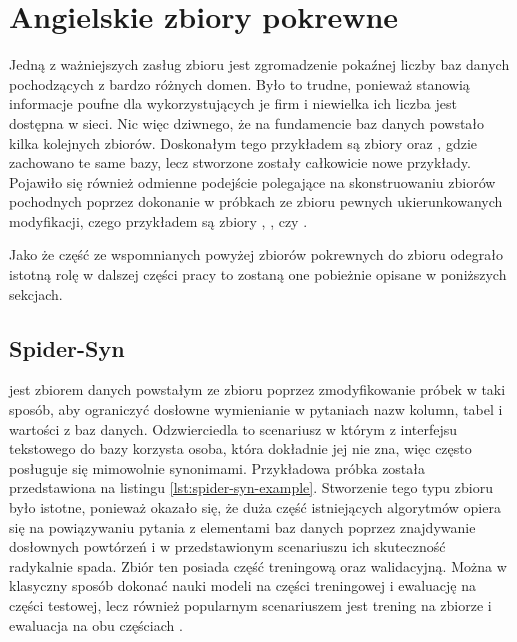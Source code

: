 \section{Angielskie zbiory pokrewne} \label{text:related-datasets}
Jedną z ważniejszych zasług zbioru  jest zgromadzenie pokaźnej liczby baz danych pochodzących z bardzo różnych domen. Było to trudne, ponieważ stanowią informacje poufne dla wykorzystujących je firm i niewielka ich liczba jest dostępna w sieci. Nic więc dziwnego, że na fundamencie baz danych  powstało kilka kolejnych zbiorów. Doskonałym tego przykładem są zbiory   oraz  , gdzie zachowano te same bazy, lecz stworzone zostały całkowicie nowe przykłady. Pojawiło się również odmienne podejście polegające na skonstruowaniu zbiorów pochodnych poprzez dokonanie w próbkach ze zbioru  pewnych ukierunkowanych modyfikacji, czego przykładem są zbiory  ,  , czy  .

Jako że część ze wspomnianych powyżej zbiorów pokrewnych do zbioru  odegrało istotną rolę w dalszej części pracy to zostaną one pobieżnie opisane w poniższych sekcjach.

\subsection{Spider-Syn}
  jest zbiorem danych powstałym ze zbioru  poprzez zmodyfikowanie próbek w taki sposób, aby ograniczyć dosłowne wymienianie w pytaniach nazw kolumn, tabel i wartości z baz danych. Odzwierciedla to scenariusz w którym z interfejsu tekstowego do bazy korzysta osoba, która dokładnie jej nie zna, więc często posługuje się mimowolnie synonimami. Przykładowa próbka została przedstawiona na listingu \ref{lst:spider-syn-example}. Stworzenie tego typu zbioru było istotne, ponieważ okazało się, że duża część istniejących algorytmów opiera się na powiązywaniu pytania z elementami baz danych poprzez znajdywanie dosłownych powtórzeń i w przedstawionym scenariuszu ich skuteczność radykalnie spada. Zbiór ten posiada część treningową oraz walidacyjną. Można w klasyczny sposób dokonać nauki modeli na części treningowej i ewaluację na części testowej, lecz również popularnym scenariuszem jest trening na zbiorze  i ewaluacja na obu częściach .

